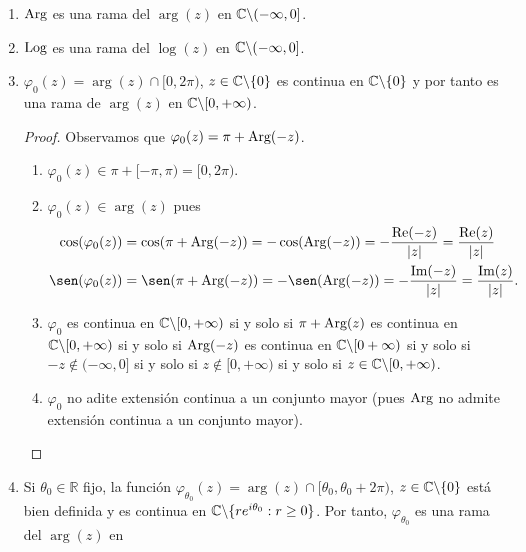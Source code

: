 \begin{ejemplo}
    \begin{enumerate}
        \item[1)] $\text{Arg}$ es una rama del $\arg(z)$ en $\mathbb{C} \backslash (-\infty,0]$.
        \item[2)] $\text{Log}$ es una rama del $\log(z)$ en $\mathbb{C} \backslash (-\infty,0]$.
        \item[3)] $\varphi_0(z) = \arg(z) \cap [0,2\pi)$, $z \in \mathbb{C} \backslash \{0\}$ es continua en $\mathbb{C} \backslash \{0\}$ y por tanto es una rama de $\arg(z)$ en $\mathbb{C} \backslash [0,+\infty)$.
              \begin{proof}
                  Observamos que $\varphi_0(z) = \pi + \text{Arg}(-z)$.
                  \begin{enumerate}
                      \item[(i)] $\varphi_0(z) \in \pi + [-\pi,\pi) = [0,2\pi)$.
                      \item[(ii)] $\varphi_0(z) \in \arg(z)$ pues
                            \begin{align*}
                                \cos(\varphi_0(z)) & = \cos(\pi + \argp(-z)) = -\cos(\argp(-z)) = -\frac{\re(-z)}{|z|} = \frac{\re(z)}{|z|}  \\
                                \sen(\varphi_0(z)) & = \sen(\pi + \argp(-z)) = -\sen(\argp(-z)) = -\frac{\im(-z)}{|z|} = \frac{\im(z)}{|z|}.
                            \end{align*}
                      \item[(iii)] $\varphi_0$ es continua en $\mathbb{C} \backslash [0,+\infty)$ si y solo si $\pi + \text{Arg}(z)$ es continua en $\mathbb{C} \backslash [0,+\infty)$ si y solo si $\text{Arg}(-z)$ es continua en $\mathbb{C} \backslash [0+\infty)$ si y solo si $-z \not \in (-\infty,0]$ si y solo si $z \not \in [0,+\infty)$ si y solo si $z \in \mathbb{C} \backslash [0,+\infty)$.
                      \item[(iv)] $\varphi_0$ no adite extensión continua a un conjunto mayor (pues $\text{Arg}$ no admite extensión continua a un conjunto mayor).
                  \end{enumerate}
              \end{proof}
        \item[4)] Si $\theta_0 \in \mathbb{R}$ fijo, la función $\varphi_{\theta_0}(z) = \arg(z) \cap [\theta_0, \theta_0 + 2\pi)$, $z \in \mathbb{C} \backslash \{0\}$ está bien definida y es continua en $\mathbb{C} \backslash \{re^{i\theta_0} : r \ge 0 \}$. Por tanto, $\varphi_{\theta_0}$ es una rama del $\arg(z)$ en
              \begin{align*}

\end{align*}
\end{enumerate}
\end{ejemplo}
